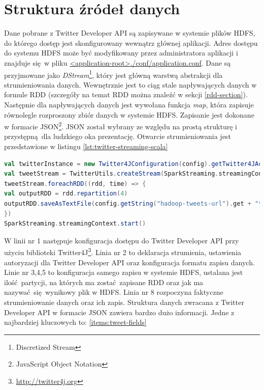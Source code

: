 \section{Struktura źródeł danych}\label{sec:tweet-structure}
Dane pobrane z Twitter Developer API są zapisywane w systemie plików HDFS, do którego dostęp jest skonfigurowany wewnątrz głównej aplikacji. Adres dostępu do systemu HDFS może być modyfikowany przez administratora aplikacji i znajduje się w pliku \url{<application-root>./conf/application.conf}. Dane są przyjmowane jako \textit{DStream}\footnote{Discretized Stream}, który jest główną warstwą abstrakcji dla strumieniowania danych. Wewnętrznie jest to ciąg stale napływających danych w formule RDD (szczegóły na temat RDD można znaleźć w sekcji \ref{rdd-section}). Następnie dla napływających danych jest wywołana funkcja \textit{map}, która zapisuje równolegle rozproszony zbiór danych w systemie HDFS. Zapisanie jest dokonane w formacie JSON\footnote{JavaScript Object Notation}. JSON został wybrany ze względu na prostą strukturę i przystępną dla ludzkiego oka prezentację. Otwarcie strumieniowania jest przedstawione w listingu \ref{lst:twitter-streaming-scala}  
\begin{lstlisting}[language=scala, caption={Otwarcie strumieniowania Twitter Developer API oraz zapis do HDFS},captionpos=b, label={lst:twitter-streaming-scala}]
val twitterInstance = new Twitter4JConfiguration(config).getTwitter4JAccess()
val tweetStream = TwitterUtils.createStream(SparkStreaming.streamingContext, Option(twitterInstance.getAuthorization)).map(new Gson().toJson(_))
tweetStream.foreachRDD((rdd, time) => {
val outputRDD = rdd.repartition(4)
outputRDD.saveAsTextFile(config.getString("hadoop-tweets-url").get + "tweet_" + time.milliseconds.toString)
})
SparkStreaming.streamingContext.start()
\end{lstlisting}
W linii nr 1 następuje konfiguracja dostępu do Twitter Developer API przy użyciu biblioteki Twitter4J\footnote{\url{http://twitter4j.org}}. Linia nr 2 to deklaracja strumienia, ustawienia autoryzacji dla Twitter Developer API oraz konfiguracja formatu zapisu danych. Linie nr 3,4,5 to konfiguracja samego zapisu w systemie HDFS, ustalana jest ilość partycji, na których ma zostać zapisane RDD oraz jak ma nazywać się wynikowy plik w HDFS. Linia nr 8 rozpoczyna faktyczne strumieniowanie danych oraz ich zapis.
\newline Struktura danych zwracana z Twitter Developer API w formacie JSON zawiera bardzo dużo informacji. Jedne z najbardziej kluczowych to: \ref{items:tweet-fields}
